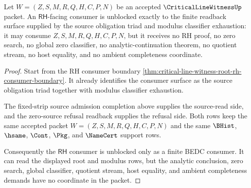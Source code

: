 \begin{theorem}
\label{thm:critical-line-witness-rh-consumer-unblock}
Let $W=(Z,S,M,R,Q,H,C,P,N)$ be an accepted $\CriticalLineWitnessUp$ packet. An $\mathsf{RH}$-facing consumer is unblocked exactly to the finite readback surface supplied by the source obligation triad and modulus classifier exhaustion: it may consume $Z,S,M,R,Q,H,C,P,N$, but it receives no RH proof, no zero search, no global zero classifier, no analytic-continuation theorem, no quotient stream, no host equality, and no ambient completeness coordinate.
\end{theorem}
\begin{proof}
Start from the RH consumer boundary \autoref{thm:critical-line-witness-root-rh-consumer-boundary}. It already identifies the consumer surface as the source obligation triad together with modulus classifier exhaustion.

The fixed-strip source admission completion above supplies the source-read side, and the zero-source refusal readback supplies the refusal side. Both rows keep the same accepted packet $W=(Z,S,M,R,Q,H,C,P,N)$ and the same $\BHist$, $\hsame$, $\Cont$, $\Pkg$, and $\NameCert$ support rows.

Consequently the $\mathsf{RH}$ consumer is unblocked only as a finite BEDC consumer. It can read the displayed root and modulus rows, but the analytic conclusion, zero search, global classifier, quotient stream, host equality, and ambient completeness demands have no coordinate in the packet.
\end{proof}
